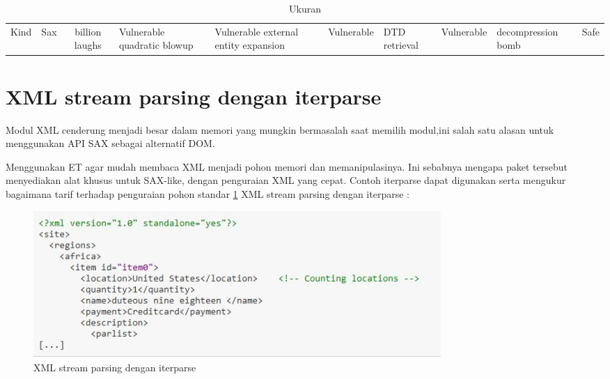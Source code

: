 \begin{table}[ht]
	\caption{Ukuran}
	\begin{tabular*}{\textwidth}{@{\extracolsep{\fill}}lcc}
		\hline
		Kind&  Sax&\cr
		\hline
		billion laughs&Vulnerable\cr
		quadratic blowup&Vulnerable\cr
		external entity expansion&Vulnerable&\cr
		DTD retrieval&Vulnerable&\cr
		decompression bomb&Safe\cr
		\hline
	\end{tabular*}
	\begin{tablenotes}
	\end{tablenotes}
\end{table}

\section{XML stream parsing dengan iterparse}
\hspace*{0.5in} Modul XML cenderung menjadi besar dalam memori yang mungkin bermasalah saat memilih modul,ini salah satu alasan untuk menggunakan API SAX sebagai alternatif DOM.

\hspace*{0.5in} Menggunakan ET agar mudah membaca XML menjadi pohon memori dan memanipulasinya. Ini sebabnya mengapa paket tersebut menyediakan alat khusus untuk SAX-like, dengan penguraian XML yang cepat. Contoh iterparse dapat digunakan serta mengukur bagaimana tarif terhadap penguraian pohon standar \ref{XML stream parsing dengan iterparse} XML stream parsing dengan iterparse :
\begin{figure}[ht]
	\centerline{\includegraphics[width=0.75\textwidth]{figures/XML}}
	\caption{XML stream parsing dengan iterparse}
	\label{XML stream parsing dengan iterparse}
\end{figure}
